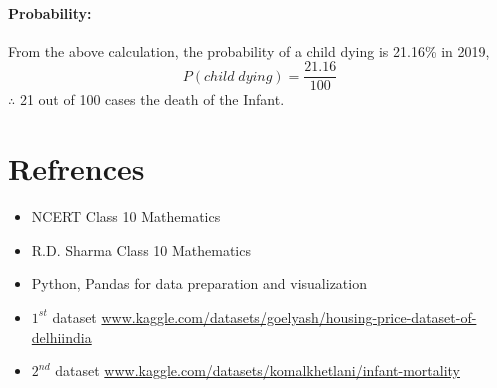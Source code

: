 \documentclass[12pt]{article}
\begin{document}
\paragraph{Probability: }
From the above calculation, the probability of a child dying is 21.16\% in 2019,
$$ P(child \; dying) = \frac{21.16}{100} $$
$\therefore$ 21 out of 100 cases the death of the Infant.\\


\pagebreak

\section{Refrences}
\begin{itemize}
    \item NCERT Class 10 Mathematics
    \item R.D. Sharma Class 10 Mathematics
    \item Python, Pandas for data preparation and visualization
    \item $1^{st}$ dataset \url{www.kaggle.com/datasets/goelyash/housing-price-dataset-of-delhiindia}
    \item $2^{nd}$ dataset \url{www.kaggle.com/datasets/komalkhetlani/infant-mortality}
\end{itemize}
\end{document}
